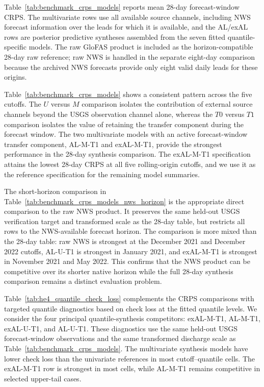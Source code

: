 \documentclass[APA,STIX1COL]{WileyNJD-v2}
\begin{document}
Table~\ref{tab:benchmark_crps_models} reports mean 28-day forecast-window CRPS. The multivariate rows use all available source channels, including NWS forecast information over the leads for which it is available, and the AL/exAL rows are posterior predictive syntheses assembled from the seven fitted quantile-specific models. The raw GloFAS product is included as the horizon-compatible 28-day raw reference; raw NWS is handled in the separate eight-day comparison because the archived NWS forecasts provide only eight valid daily leads for these origins.



Table~\ref{tab:benchmark_crps_models} shows a consistent pattern across the five cutoffs. The \(U\) versus \(M\) comparison isolates the contribution of external source channels beyond the USGS observation channel alone, whereas the \(T0\) versus \(T1\) comparison isolates the value of retaining the transfer component during the forecast window. The two multivariate models with an active forecast-window transfer component, AL-M-T1 and exAL-M-T1, provide the strongest performance in the 28-day synthesis comparison. The exAL-M-T1 specification attains the lowest 28-day CRPS at all five rolling-origin cutoffs, and we use it as the reference specification for the remaining model summaries.



The short-horizon comparison in Table~\ref{tab:benchmark_crps_models_nws_horizon} is the appropriate direct comparison to the raw NWS product. It preserves the same held-out USGS verification target and transformed scale as the 28-day table, but restricts all rows to the NWS-available forecast horizon. The comparison is more mixed than the 28-day table: raw NWS is strongest at the December 2021 and December 2022 cutoffs, AL-U-T1 is strongest in January 2021, and exAL-M-T1 is strongest in November 2021 and May 2022. This confirms that the NWS product can be competitive over its shorter native horizon while the full 28-day synthesis comparison remains a distinct evaluation problem.

Table~\ref{tab:he4_quantile_check_loss} complements the CRPS comparisons with targeted quantile diagnostics based on check loss at the fitted quantile levels. We consider the four principal quantile-synthesis competitors: exAL-M-T1, AL-M-T1, exAL-U-T1, and AL-U-T1. These diagnostics use the same held-out USGS forecast-window observations and the same transformed discharge scale as Table~\ref{tab:benchmark_crps_models}. The multivariate synthesis models have lower check loss than the univariate references in most cutoff--quantile cells. The exAL-M-T1 row is strongest in most cells, while AL-M-T1 remains competitive in selected upper-tail cases.
\end{document}
